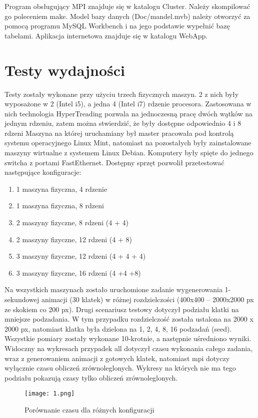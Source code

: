 \documentclass[a4paper]{article}
\begin{document}
Program obsługujący MPI znajduje się w katalogu Cluster. Należy skompilować go poleceniem make. Model bazy danych (Doc/mandel.mvb) należy otworzyć za pomocą programu MySQL Workbench i na jego podstawie wypełnić bazę tabelami. Aplikacja internetowa znajduje się w katalogu WebApp.

\section{Testy wydajności}
Testy zostały wykonane przy użyciu trzech fizycznych maszyn. 2 z nich były wyposażone w 2 (Intel i5), a jedna 4 (Intel i7) rdzenie procesora. Zastosowana w nich technologia HyperTreading pozwala na jednoczesną pracę dwóch wątków na jednym rdzeniu, zatem można stwierdzić, że były dostępne odpowiednio 4 i 8 rdzeni Maszyna na której uruchamiany był master pracowała pod kontrolą systemu operacyjnego Linux Mint, natomiast na pozostałych były zainstalowane maszyny wirtualne z systemem Linux Debian. Komputery były spięte do jednego switcha z portami FastEthernet. Dostępny sprzęt pozwolił przetestować następujące konfiguracje:
\begin{enumerate}
\item 1 maszyna fizyczna, 4 rdzenie
\item 1 maszyna fizyczna, 8 rdzeni
\item 2 maszyny fizyczne, 8 rdzeni (4 + 4)
\item 2 maszyny fizyczne, 12 rdzeni (4 + 8)
\item 3 maszyny fizyczne, 12 rdzeni (4 + 4 + 4)
\item 3 maszyny fizyczne, 16 rdzeni (4 +4 +8)
\end{enumerate}

Na wszystkich maszynach zostało uruchomione zadanie wygenerowania 1-sekundowej animacji (30 klatek) w różnej rozdzielczości (400x400 – 2000x2000 px ze skokiem co 200 px). Drugi scenariusz testowy dotyczył podziału klatki na mniejsze podzadania. W tym przypadku rozdzielczość została ustalona na 2000 x 2000 px, natomiast klatka była dzielona na 1, 2, 4, 8, 16 podzadań (seed). Wszystkie pomiary zostały wykonane 10-krotnie, a następnie uśredniono wyniki. Widoczny na wykresach przypadek all dotyczył czasu wykonania całego zadania, wraz z generowaniem animacji z gotowych klatek, natomiast mpi dotyczy wyłącznie czasu obliczeń zrównoleglonych. Wykresy na których nie ma tego podziału pokazują czasy tylko obliczeń zrównoleglonych.

\begin{figure}[H]
    \centering
    \texttt{[image: 1.png]}
    \caption{Porównanie czasu dla różnych konfiguracji}
    \label{fig:w1}
\end{figure}
\end{document}
